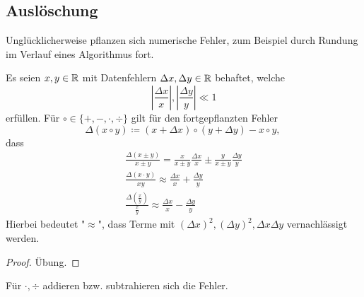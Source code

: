 \subsection{Auslöschung}
Unglücklicherweise pflanzen sich numerische Fehler, zum Beispiel durch Rundung im Verlauf eines Algorithmus fort.

\begin{lemma}[Fehlerfortpflanzung]
Es seien $x,y \in \mathbb{R}$ mit Datenfehlern $\Delta x, \Delta y \in  \mathbb{R}$ behaftet, welche\[
|\frac{\Delta x}{x}| , |\frac{\Delta y}{y}| \ll 1
\]
erfüllen. Für $\circ \in  \{+,-,\cdot, \div\}$ gilt für den fortgepflanzten Fehler
\[
\Delta (x \circ y) \coloneqq (x+ \Delta x) \circ (y + \Delta y) - x \circ y \text{, }
\]
dass
\begin{equation*}
\begin{split}
\frac{\Delta (x \pm y)}{x \pm y} = \frac{x}{x \pm y}\frac{\Delta x}{x} \pm \frac{y}{x \pm y} \frac{\Delta y}{y} \\
\frac{\Delta (x \cdot y)}{xy} \approx \frac{\Delta x}{x}+ \frac{\Delta y}{y} \\
\frac{\Delta (\frac{x}{y})}{\frac{x}{y}} \approx \frac{\Delta x}{x}-\frac{\Delta y}{y}
\end{split}
\end{equation*}
Hierbei bedeutet "$\approx$", dass Terme mit $(\Delta x)^2, (\Delta y)^2, \Delta x \Delta y$ vernachlässigt werden.
\end{lemma}
\begin{proof}
Übung.
\end{proof}
Für $\cdot,\div$ addieren bzw. subtrahieren sich die Fehler.
